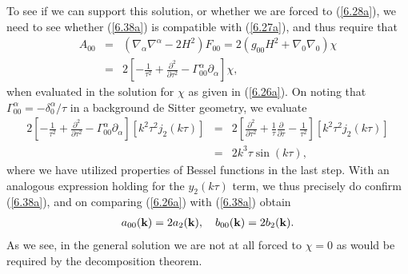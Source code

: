 To see if we can support this solution, or whether we are forced to (\ref{6.28a}), we need to see whether (\ref{6.38a}) is compatible  with  (\ref{6.27a}), and thus require that
%
\begin{eqnarray}
A_{00}&=&(\nabla_{\alpha}\nabla^{\alpha}-2H^2)F_{00}=2(g_{00}H^2+\nabla_{0}\nabla_{0})\chi
\nonumber\\
&=&2\left[-\frac{1}{\tau^2}+\frac{\partial^2}{\partial \tau^2}-\Gamma^{\alpha}_{00}\partial_{\alpha}\right]\chi,
\label{6.39}
\end{eqnarray}
%
when evaluated in the solution  for $\chi$ as given in (\ref{6.26a}). On noting that $\Gamma^{\alpha}_{00}=-\delta^{\alpha}_0/\tau$ in a background de Sitter geometry, we evaluate
%
\begin{eqnarray}
2\left[-\frac{1}{\tau^2}+\frac{\partial^2}{\partial \tau^2}-\Gamma^{\alpha}_{00}\partial_{\alpha}\right][k^2\tau^2j_2(k\tau)]&=&2\left[\frac{\partial^2}{\partial \tau^2}+\frac{1}{\tau}\frac{\partial}{\partial \tau}-\frac{1}{\tau^2}\right][k^2\tau^2j_2(k\tau)]
\nonumber\\
&=&2k^3\tau\sin(k\tau),
\label{6.40}
\end{eqnarray}
%
where we have utilized properties of Bessel functions in the last step. With an analogous expression holding for the $y_2(k\tau)$ term, we thus precisely do confirm (\ref{6.38a}), and on comparing (\ref{6.26a}) with (\ref{6.38a}) obtain
%
\begin{eqnarray}
a_{00}({\bf k})=2a_2({\bf k}), \quad b_{00}({\bf k})=2b_2({\bf k}).
\label{6.41}
\end{eqnarray}
%
As we see, in the general solution we are not at all forced to $\chi=0$ as would be required by the decomposition theorem.

